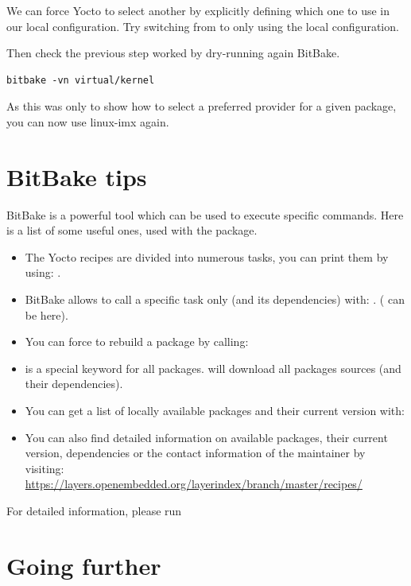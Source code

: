 We can force Yocto to select another  by explicitly
defining which one to use in our local configuration. Try switching
from  to  only using the
local configuration.

Then check the previous step worked by dry-running again BitBake.
\begin{verbatim}
bitbake -vn virtual/kernel
\end{verbatim}

As this was only to show how to select a preferred provider for a given package, you can now use linux-imx again.
\section{BitBake tips}

BitBake is a powerful tool which can be used to execute specific commands. Here
is a list of some useful ones, used with the  package.

\begin{itemize}
  \item The Yocto recipes are divided into numerous tasks, you can print them
        by using: .
  \item BitBake allows to call a specific task only (and its dependencies)
        with: . ( can be
         here).
  \item You can force to rebuild a package by calling: 
  \item {} is a special keyword for all packages.  will download all packages sources (and their
        dependencies).
  \item You can get a list of locally available packages and their current
        version with: \\
  \item You can also find detailed information on available packages, their
        current version, dependencies or the contact information of the
        maintainer by visiting: \\
        \url{https://layers.openembedded.org/layerindex/branch/master/recipes/}
\end{itemize}

For detailed information, please run 

\section{Going further}

